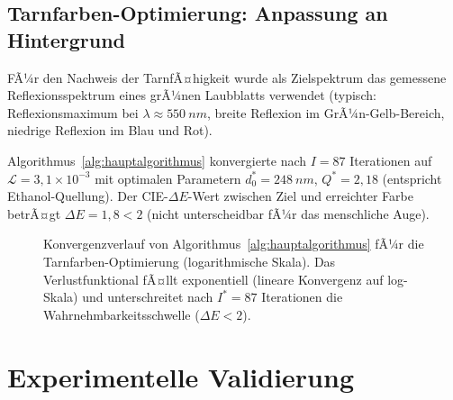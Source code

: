 ﻿\documentclass[a4paper,12pt]{article}
\theoremstyle{definition}
\begin{document}
	\subsection{Tarnfarben-Optimierung: Anpassung an Hintergrund}
	
	FÃ¼r den Nachweis der TarnfÃ¤higkeit wurde als Zielspektrum das gemessene
	Reflexionsspektrum eines grÃ¼nen Laubblatts verwendet
	(typisch: Reflexionsmaximum bei $\lambda \approx \SI{550}{nm}$,
	breite Reflexion im GrÃ¼n-Gelb-Bereich, niedrige Reflexion im Blau und Rot).
	
	Algorithmus~\ref{alg:hauptalgorithmus} konvergierte nach $I = 87$ Iterationen
	auf $\mathcal{L} = 3{,}1 \times 10^{-3}$ mit optimalen Parametern
	$d_0^* = \SI{248}{nm}$, $Q^* = 2{,}18$ (entspricht Ethanol-Quellung).
	Der CIE-$\Delta E$-Wert zwischen Ziel und erreichter Farbe betrÃ¤gt $\Delta E = 1{,}8 < 2$
	(nicht unterscheidbar fÃ¼r das menschliche Auge).
	
	\begin{figure}[htb]
		\centering
		\caption{Konvergenzverlauf von Algorithmus~\ref{alg:hauptalgorithmus}
			fÃ¼r die Tarnfarben-Optimierung (logarithmische Skala). Das Verlustfunktional
			fÃ¤llt exponentiell (lineare Konvergenz auf log-Skala) und unterschreitet
			nach $I^* = 87$ Iterationen die Wahrnehmbarkeitsschwelle ($\Delta E < 2$).}
		\label{fig:konvergenz}
	\end{figure}
	
	\section{Experimentelle Validierung}
	\label{sec:validierung}
	
\end{document}

